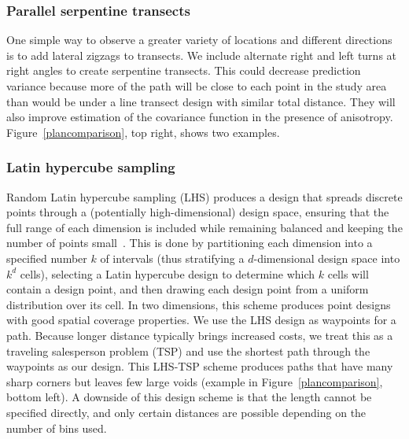 \documentclass[review]{elsarticle}
\begin{document}
\subsubsection{Parallel serpentine transects}

One simple way to observe a greater variety of locations and different
directions is to add lateral zigzags to transects. We include alternate right
and left turns at right angles to create serpentine transects. This could
decrease prediction variance because more of the path will be close to each
point in the study area than would be under a line transect design with similar
total distance. They will also improve estimation of the covariance function
in the presence of anisotropy. Figure~\ref{plancomparison}, top right, shows
two examples.



\subsubsection{Latin hypercube sampling}

Random Latin hypercube sampling (LHS) produces a design that spreads discrete
points through a (potentially high-dimensional) design space, ensuring that
the full range of each dimension is included while remaining balanced and
keeping the number of points small~\citep{mckayetal}. This is done by
partitioning each dimension into a specified number \(k\) of intervals (thus
stratifying a \(d\)-dimensional design space into \(k^{d}\) cells), selecting
a Latin hypercube design to determine which \(k\) cells will contain a design
point, and then drawing each design point from a uniform distribution over its
cell. In two dimensions, this scheme produces point designs with good spatial
coverage properties. We use the LHS design as waypoints for a path. Because
longer distance typically brings increased costs, we treat this as a traveling
salesperson problem (TSP) and use the shortest path through the waypoints as
our design. This LHS-TSP scheme produces paths that have many sharp corners but
leaves few large voids (example in Figure~\ref{plancomparison}, bottom left). A
downside of this design scheme is that the length cannot be specified directly,
and only certain distances are possible depending on the number of bins used.
\end{document}
